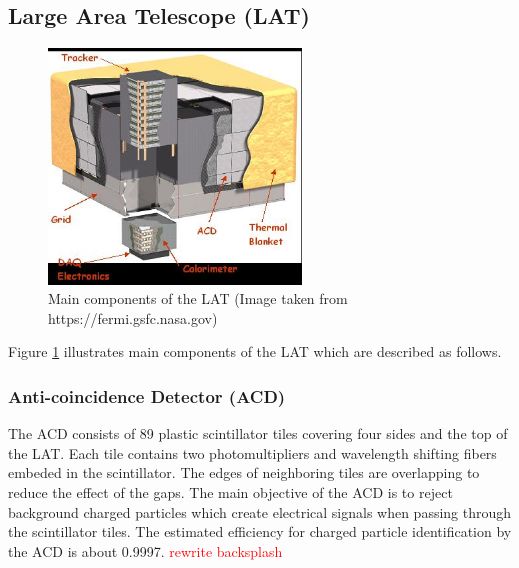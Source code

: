 \subsection{Large Area Telescope (LAT)}


\begin{figure}[h!]
    \centering
    \includegraphics[width=0.6\textwidth]{content/background/figures/LATStructure.jpg}
    \caption{Main components of the LAT (Image taken from https://fermi.gsfc.nasa.gov)}
    \label{fig:fermi_lat_structure}
\end{figure}

Figure \ref{fig:fermi_lat_structure} illustrates main components of the LAT
which are described as follows.




\subsubsection{Anti-coincidence Detector (ACD)}
The ACD consists of 89 plastic scintillator tiles covering four
sides and the top of the LAT. Each tile contains two
photomultipliers and wavelength shifting fibers embeded
in the scintillator. The edges of neighboring tiles are
overlapping to reduce the effect of the gaps.
The main objective of the ACD is to reject background
charged particles which create electrical signals when
passing through the scintillator tiles.
The estimated efficiency for charged particle identification
by the ACD is about 0.9997.
\textcolor{red}{rewrite backsplash}

